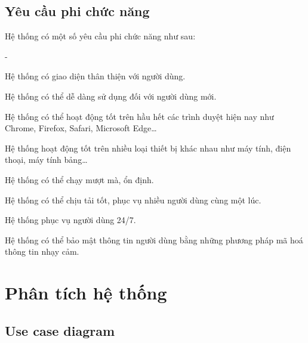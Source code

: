 \subsection{Yêu cầu phi chức năng}
Hệ thống có một số yêu cầu phi chức năng như sau:
\begin {list} {-}{}
    \item Hệ thống có giao diện thân thiện với người dùng.
    \item Hệ thống có thể dễ dàng sử dụng đối với người dùng mới.
    \item Hệ thống có thể hoạt động tốt trên hầu hết các trình duyệt hiện nay như Chrome, Firefox, Safari, Microsoft Edge\dots
    \item Hệ thống hoạt động tốt trên nhiều loại thiết bị khác nhau như máy tính, điện thoại, máy tính bảng\dots
    \item Hệ thống có thể chạy mượt mà, ổn định.
    \item Hệ thống có thể chịu tải tốt, phục vụ nhiều người dùng cùng một lúc.
    \item Hệ thống phục vụ người dùng 24/7.
    \item Hệ thống có thể bảo mật thông tin người dùng bằng những phương pháp mã hoá thông tin nhạy cảm.
\newpage
\section{Phân tích hệ thống}
\subsection{Use case diagram}

\end{list}
